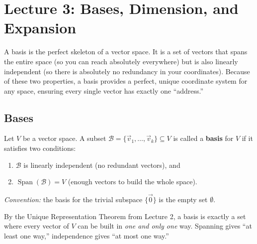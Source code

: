 \section{Lecture 3: Bases, Dimension, and Expansion}

\begin{intuition}
A basis is the perfect skeleton of a vector space. It is a set of vectors that spans the entire space (so you can reach absolutely everywhere) but is also linearly independent (so there is absolutely no redundancy in your coordinates). Because of these two properties, a basis provides a perfect, unique coordinate system for any space, ensuring every single vector has exactly one ``address.''
\end{intuition}

\subsection{Bases}

\begin{definition}[Basis]
Let $V$ be a vector space. A subset $\mathcal{B} = \{\vec{v}_1, \dots, \vec{v}_k\} \subseteq V$ is called a \textbf{basis} for $V$ if it satisfies two conditions:
\begin{enumerate}
    \item $\mathcal{B}$ is linearly independent (no redundant vectors), and
    \item $\operatorname{Span}(\mathcal{B}) = V$ (enough vectors to build the whole space).
\end{enumerate}
\emph{Convention:} the basis for the trivial subspace $\{\vec{0}\}$ is the empty set $\emptyset$.
\end{definition}

\begin{remark}
By the Unique Representation Theorem from Lecture 2, a basis is exactly a set where every vector of $V$ can be built in \emph{one and only one} way. Spanning gives ``at least one way,'' independence gives ``at most one way.''
\end{remark}

